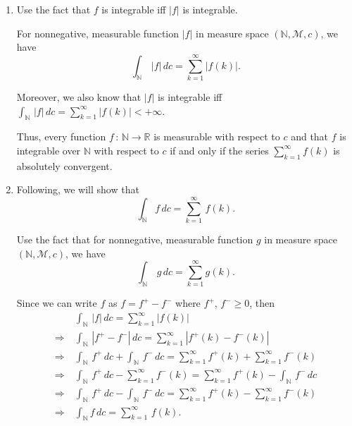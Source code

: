 \documentclass[a4paper,11pt]{article}
\begin{document}

\begin{enumerate}
	\item Use the fact that $f$ is integrable iff $|f|$ is integrable.

	For nonnegative, measurable function $|f|$ in measure space $(\mathbb{N}, \mathcal{M}, c)$, we have
		$$\int_{\mathbb{N}}\,|f|\,dc
		= \sum_{k = 1}^\infty|f(k)|.$$

	Moreover, we also know that $|f|$ is integrable iff $\int_{\mathbb{N}}\,|f|\,dc = \sum_{k = 1}^\infty|f(k)|< +\infty$.

	Thus, every function $f\,:\,\mathbb{N} \to \mathbb{R}$ is measurable with respect to $c$ and that $f$ is integrable over $\mathbb{N}$ with respect to $c$ if and only if the series $\sum_{k=1}^\infty f(k)$ is absolutely convergent.

	\item Following, we will show that
		$$\int_{\mathbb{N}} f\,dc = \sum_{k=1}^\infty\,f(k).$$

	Use the fact that for nonnegative, measurable function $g$ in measure space $(\mathbb{N}, \mathcal{M}, c)$, we have
		$$\int_{\mathbb{N}}\,g\,dc
		= \sum_{k = 1}^\infty g(k).$$

	Since we can write $f$ as $f = f^+ - f^-$ where $f^+,\,f^- \geq 0$, then
		$$\begin{aligned}
		&\int_{\mathbb{N}}\,|f|\,dc
		= \sum_{k = 1}^\infty|f(k)|\\
		\Rightarrow\ &\int_{\mathbb{N}}\,|f^+ - f^-|\,dc
		= \sum_{k = 1}^\infty|f^+(k) - f^-(k)|\\
		\Rightarrow\ &\int_{\mathbb{N}}\,f^+\,dc + \int_{\mathbb{N}}\,f^-\,dc
		= \sum_{k = 1}^\infty f^+(k) + \sum_{k = 1}^\infty f^-(k)\\
		\Rightarrow\ &\int_{\mathbb{N}}\,f^+\,dc - \sum_{k = 1}^\infty f^-(k)
		= \sum_{k = 1}^\infty f^+(k) - \int_{\mathbb{N}}\,f^-\,dc\\
		\Rightarrow\ &\int_{\mathbb{N}}\,f^+\,dc - \int_{\mathbb{N}}\,f^-\,dc
		= \sum_{k = 1}^\infty f^+(k) - \sum_{k = 1}^\infty f^-(k)\\
		\Rightarrow\ &\int_{\mathbb{N}} f\,dc = \sum_{k=1}^\infty\,f(k).
		\end{aligned}$$
\end{enumerate}

\end{document}
